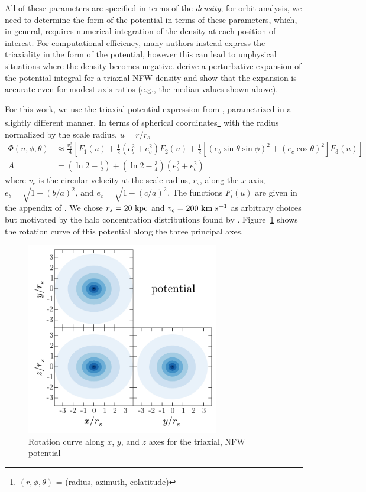 \documentclass[letterpaper,12pt,preprint]{aastex}
\begin{document}
All of these parameters are specified in terms of the \emph{density}; for orbit analysis, we need to determine the form of the potential in terms of these parameters, which, in general, requires numerical integration of the density at each position of interest. For computational efficiency, many authors instead express the triaxiality in the form of the potential, however this can lead to unphysical situations where the density becomes negative. \citet{leesuto03} derive a perturbative expansion of the potential integral for a triaxial NFW density and show that the expansion is accurate even for modest axis ratios (e.g., the median values shown above). 

For this work, we use the triaxial potential expression from \citet{leesuto03}, parametrized in a slightly different manner. In terms of spherical coordinates\footnote{$(r,\phi,\theta)$ = (radius, azimuth, colatitude)} with the radius normalized by the scale radius, $u = r/r_s$
\begin{align}
	\Phi(u,\phi,\theta) &\approx \frac{v_c^2}{A}\left[F_1(u) + \frac{1}{2}(e_b^2 + e_c^2)F_2(u) + \frac{1}{2} [(e_b\sin\theta \sin\phi)^2 + (e_c\cos\theta)^2] F_3(u) \right]\\
	A &= \left(\ln2 - \frac{1}{2}\right) + \left(\ln2-\frac{3}{4}\right) (e_b^2 + e_c^2)
\end{align}
where $v_c$ is the circular velocity at the scale radius, $r_s$, along the $x$-axis, $e_b = \sqrt{1 - (b/a)^2}$, and $e_c = \sqrt{1 - (c/a)^2}$. The functions $F_i(u)$ are given in the appendix of \cite{leesuto03}. We chose $r_s=20~{\rm kpc}$ and $v_c = 200~{\rm km}~{\rm s}^{-1}$ as arbitrary choices but motivated by the halo concentration distributions found by \cite{jing02}. Figure~\ref{fig:potential} shows the rotation curve of this potential along the three principal axes.

\begin{figure}[!h]
\begin{center}
\includegraphics[width=0.75\textwidth]{figures/potential.pdf}
\caption{Rotation curve along $x$, $y$, and $z$ axes for the triaxial, NFW potential } \label{fig:potential}
\end{center}
\end{figure}
\end{document}
